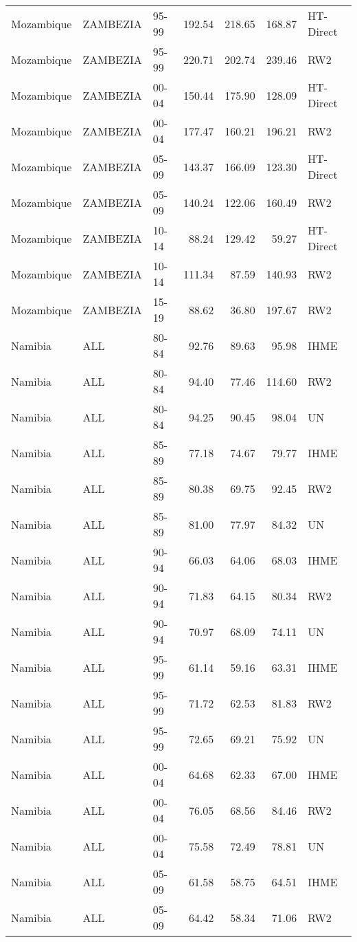 \begin{longtable}{lllrrrl}
  Mozambique & ZAMBEZIA & 95-99 & 192.54 & 218.65 & 168.87 & HT-Direct \\ 
  Mozambique & ZAMBEZIA & 95-99 & 220.71 & 202.74 & 239.46 & RW2 \\ 
  Mozambique & ZAMBEZIA & 00-04 & 150.44 & 175.90 & 128.09 & HT-Direct \\ 
  Mozambique & ZAMBEZIA & 00-04 & 177.47 & 160.21 & 196.21 & RW2 \\ 
  Mozambique & ZAMBEZIA & 05-09 & 143.37 & 166.09 & 123.30 & HT-Direct \\ 
  Mozambique & ZAMBEZIA & 05-09 & 140.24 & 122.06 & 160.49 & RW2 \\ 
  Mozambique & ZAMBEZIA & 10-14 & 88.24 & 129.42 & 59.27 & HT-Direct \\ 
  Mozambique & ZAMBEZIA & 10-14 & 111.34 & 87.59 & 140.93 & RW2 \\ 
  Mozambique & ZAMBEZIA & 15-19 & 88.62 & 36.80 & 197.67 & RW2 \\ 
  Namibia & ALL & 80-84 & 92.76 & 89.63 & 95.98 & IHME \\ 
  Namibia & ALL & 80-84 & 94.40 & 77.46 & 114.60 & RW2 \\ 
  Namibia & ALL & 80-84 & 94.25 & 90.45 & 98.04 & UN \\ 
  Namibia & ALL & 85-89 & 77.18 & 74.67 & 79.77 & IHME \\ 
  Namibia & ALL & 85-89 & 80.38 & 69.75 & 92.45 & RW2 \\ 
  Namibia & ALL & 85-89 & 81.00 & 77.97 & 84.32 & UN \\ 
  Namibia & ALL & 90-94 & 66.03 & 64.06 & 68.03 & IHME \\ 
  Namibia & ALL & 90-94 & 71.83 & 64.15 & 80.34 & RW2 \\ 
  Namibia & ALL & 90-94 & 70.97 & 68.09 & 74.11 & UN \\ 
  Namibia & ALL & 95-99 & 61.14 & 59.16 & 63.31 & IHME \\ 
  Namibia & ALL & 95-99 & 71.72 & 62.53 & 81.83 & RW2 \\ 
  Namibia & ALL & 95-99 & 72.65 & 69.21 & 75.92 & UN \\ 
  Namibia & ALL & 00-04 & 64.68 & 62.33 & 67.00 & IHME \\ 
  Namibia & ALL & 00-04 & 76.05 & 68.56 & 84.46 & RW2 \\ 
  Namibia & ALL & 00-04 & 75.58 & 72.49 & 78.81 & UN \\ 
  Namibia & ALL & 05-09 & 61.58 & 58.75 & 64.51 & IHME \\ 
  Namibia & ALL & 05-09 & 64.42 & 58.34 & 71.06 & RW2 \\ 

\end{longtable}
